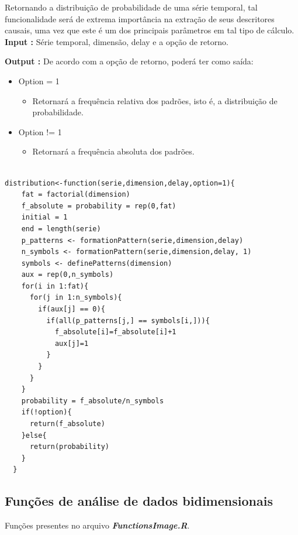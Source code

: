 \documentclass[12pt,letterpaper]{article}
\begin{document}
Retornando a distribuição de probabilidade de uma série temporal, tal funcionalidade será de extrema importância na extração de seus descritores causais, uma vez que este é um dos principais parâmetros em tal tipo de cálculo.\\

\textbf{Input :} Série temporal, dimensão, delay e a opção de retorno.

\textbf{Output :} De acordo com a opção de retorno, poderá ter como saída:

\begin{itemize}
\item Option = 1
	\begin{itemize}
	\item Retornará a frequência relativa dos padrões, isto é, a distribuição de probabilidade.
	\end{itemize}
\item Option != 1
	\begin{itemize}
	\item Retornará a frequência absoluta dos padrões.
	\end{itemize}
\end{itemize}

\begin{lstlisting}

distribution<-function(serie,dimension,delay,option=1){  
    fat = factorial(dimension)
    f_absolute = probability = rep(0,fat)
    initial = 1
    end = length(serie)
    p_patterns <- formationPattern(serie,dimension,delay)
    n_symbols <- formationPattern(serie,dimension,delay, 1)
    symbols <- definePatterns(dimension)
    aux = rep(0,n_symbols)  
    for(i in 1:fat){
      for(j in 1:n_symbols){
        if(aux[j] == 0){
          if(all(p_patterns[j,] == symbols[i,])){ 
            f_absolute[i]=f_absolute[i]+1
            aux[j]=1
          }
        }
      }
    }
    probability = f_absolute/n_symbols
    if(!option){
      return(f_absolute)
    }else{
      return(probability)
    }
  }

\end{lstlisting}

\subsection{Funções de análise de dados bidimensionais}

Funções presentes no arquivo \textbf{\textit{FunctionsImage.R}}.\\
\end{document}
